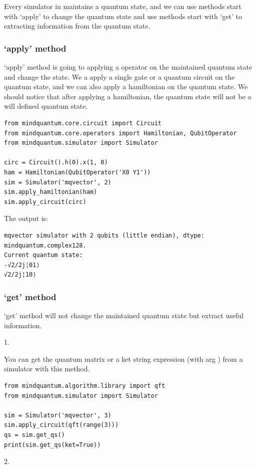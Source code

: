 Every simulator in \MindQuantum maintains a quantum state, and we can use methods start with `apply' to change the quantum state and use methods start with `get' to extracting information from the quantum state.

\subsubsection{`apply' method}

`apply' method is going to applying a operator on the maintained quantum state and change the state. We a apply a single gate or a quantum circuit on the quantum state, and we can also apply a hamiltonian on the quantum state. We should notice that after applying a hamiltonian, the quantum state will not be a will defined quantum state.

\begin{lstlisting}
from mindquantum.core.circuit import Circuit
from mindquantum.core.operators import Hamiltonian, QubitOperator
from mindquantum.simulator import Simulator

circ = Circuit().h(0).x(1, 0)
ham = Hamiltonian(QubitOperator('X0 Y1'))
sim = Simulator('mqvector', 2)
sim.apply_hamiltonian(ham)
sim.apply_circuit(circ)
\end{lstlisting}
The output is:
\begin{lstlisting}
mqvector simulator with 2 qubits (little endian), dtype: mindquantum.complex128.
Current quantum state:
-√2/2j¦01⟩
√2/2j¦10⟩
\end{lstlisting}

\subsubsection{`get' method}

`get' method will not change the maintained quantum state but extract useful information.

1. \getqs

You can get the quantum matrix or a ket string expression (with arg ) from a simulator with this method.
\begin{lstlisting}
from mindquantum.algorithm.library import qft
from mindquantum.simulator import Simulator

sim = Simulator('mqvector', 3)
sim.apply_circuit(qft(range(3)))
qs = sim.get_qs()
print(sim.get_qs(ket=True))
\end{lstlisting}

2. \getexpectation

